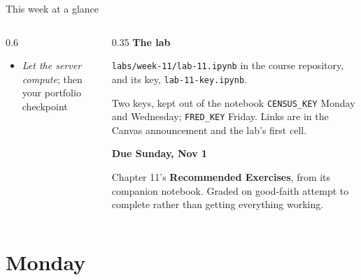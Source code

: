 \documentclass[9pt,aspectratio=169]{beamer}
\begin{document}
\begin{frame}{This week at a glance}
\begin{columns}[T]
\begin{column}{0.6\textwidth}
            \begin{itemize}\small
                \item \textit{Let the server compute}; then your portfolio checkpoint
            \end{itemize}
        \end{column}
        \begin{column}{0.35\textwidth}
            \textbf{The lab}\\[2pt]
            {\footnotesize \texttt{labs/week-11/lab-11.ipynb} in the course repository, and its key, \texttt{lab-11-key.ipynb}.\par}
            \medskip
            \begin{alertblock}{Two keys, kept out of the notebook}
                \footnotesize \texttt{CENSUS\_KEY} Monday and Wednesday; \texttt{FRED\_KEY} Friday. Links are in the Canvas announcement and the lab's first cell.
            \end{alertblock}
            \textbf{Due Sunday, Nov 1}\\[2pt]
            {\footnotesize Chapter 11's \textbf{Recommended Exercises}, from its companion notebook. Graded on good-faith attempt to complete rather than getting everything working.\par}
            \medskip
        \end{column}
    \end{columns}
\end{frame}

\section{Monday}
\end{document}
